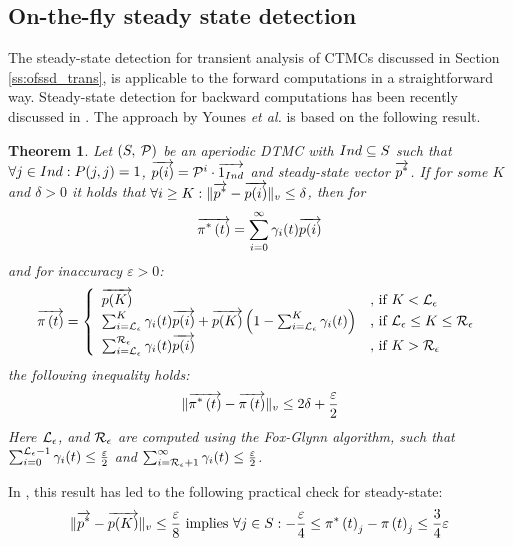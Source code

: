 \documentclass[a4paper,11pt]{article}
\newcommand{\SubSection}[1]{\subsection{#1}}
\newtheorem{theorem}{Theorem}
\newtheorem{corollary}[theorem]{Corollary}
\begin{document}
	\SubSection{On-the-fly steady state detection  \label{ss:ussd}}
		The steady-state detection for transient analysis of CTMCs discussed in Section \ref{ss:ofssd_trans}, is applicable to the forward computations in a straightforward way. Steady-state detection for backward computations has been recently discussed in \cite{YounesKNP_STTT05}.  The approach by Younes \emph{et al.} is based on the following result.

		\begin{theorem}
			Let $\left( S,\: \mathcal{P} \right)$ be an aperiodic DTMC with $Ind \subseteq S$ such that $\forall j \in Ind : P(j,j) = 1$, $\overrightarrow{p(i)}=\mathcal{P}^{i} \cdot \overrightarrow{1_{Ind}}$ and steady-state vector $\overrightarrow{p^{*}}$. If for some $K$ and $\delta > 0$ it holds that $\forall i \geq K:\lVert \overrightarrow{p^{*}} - \overrightarrow{p(i)} \rVert_{v} \leq \delta$, then for
			\begin{equation}
				\overrightarrow{\pi^{*} \left( t \right)} = \sum_{i=0}^{\infty}\gamma_{i}(t) \overrightarrow{p(i)} \nonumber
			\end{equation}
			and for inaccuracy $\varepsilon > 0$:
			\begin{equation}
				\displaystyle
				\overrightarrow{\pi \left( t \right) } = \left\{
				\begin{array}{ll}
					\overrightarrow{p(K)} & \text{, if } K < \mathcal{L}_{\epsilon}\\
					\sum_{i=\mathcal{L}_{\epsilon}}^{K}\gamma_{i}(t) \overrightarrow{p(i)} + \overrightarrow{p(K)} \left(1- \sum_{i=\mathcal{L}_{\epsilon}}^{K}\gamma_{i}(t) \right) & \text{, if } \mathcal{L}_{\epsilon} \leq K \leq \mathcal{R}_{\epsilon}\\
					\sum_{i=\mathcal{L}_{\epsilon}}^{\mathcal{R}_{\epsilon}}\gamma_{i}(t) \overrightarrow{p(i)} & \text{, if } K > \mathcal{R}_{\epsilon}\\
				\end{array}
				\right .
				\label{eq:ssd_LR_b}
			\end{equation}
			the following inequality holds:
			\begin{equation}
				\lVert  \overrightarrow{\pi^{*} \left( t \right)} - \overrightarrow{\pi \left( t \right) }  \rVert_{v} \leq 2 \delta + \frac{\varepsilon}{2} \nonumber
			\end{equation}
			Here $\mathcal{L}_{\epsilon}$, and $\mathcal{R}_{\epsilon}$ are computed using the Fox-Glynn algorithm, such that $\sum_{i=0}^{\mathcal{L}_{\epsilon}{-}1} \gamma_{i}(t) \leq \frac{\varepsilon}{2}$ and $\sum_{i=\mathcal{R}_{\epsilon}{+}1}^{\infty} \gamma_{i}(t) \leq \frac{\varepsilon}{2}$.
			\label{th:error_bwd_initial}
		\end{theorem}
		In \cite{YounesKNP_STTT05}, this result has led to the following practical check for steady-state:
			\begin{equation}
				\lVert \overrightarrow{p^{*}} - \overrightarrow{p(K)} \rVert_{v} \leq \frac{\varepsilon}{8} \text{ implies } \forall j \in S : -\frac{\varepsilon}{4} \leq \pi^{*} \left( t \right)_{j} - \pi \left( t \right)_{j} \leq \frac{3}{4}\varepsilon \label{eq:youn_cr_cor}
			\end{equation}
\end{document}

